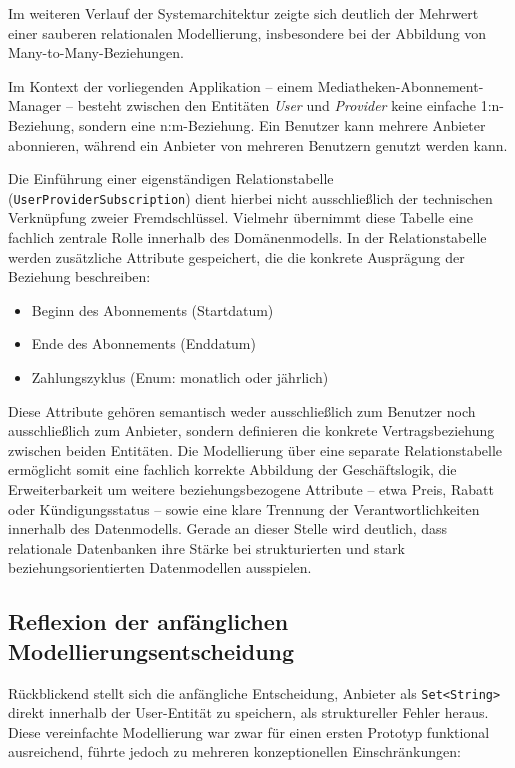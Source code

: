 Im weiteren Verlauf der Systemarchitektur zeigte sich deutlich der Mehrwert einer
sauberen relationalen Modellierung, insbesondere bei der Abbildung von
Many-to-Many-Beziehungen.

Im Kontext der vorliegenden Applikation -- einem Mediatheken-Abonnement-Manager --
besteht zwischen den Entitäten \textit{User} und \textit{Provider} keine einfache
1:n-Beziehung, sondern eine n:m-Beziehung. Ein Benutzer kann mehrere Anbieter
abonnieren, während ein Anbieter von mehreren Benutzern genutzt werden kann.

Die Einführung einer eigenständigen Relationstabelle (\texttt{UserProviderSubscription})
dient hierbei nicht ausschließlich der technischen Verknüpfung zweier Fremdschlüssel.
Vielmehr übernimmt diese Tabelle eine fachlich zentrale Rolle innerhalb des
Domänenmodells. In der Relationstabelle werden zusätzliche Attribute gespeichert,
die die konkrete Ausprägung der Beziehung beschreiben:

\begin{itemize}
    \item Beginn des Abonnements (Startdatum)
    \item Ende des Abonnements (Enddatum)
    \item Zahlungszyklus (Enum: monatlich oder jährlich)
\end{itemize}

Diese Attribute gehören semantisch weder ausschließlich zum Benutzer noch
ausschließlich zum Anbieter, sondern definieren die konkrete Vertragsbeziehung
zwischen beiden Entitäten. Die Modellierung über eine separate Relationstabelle
ermöglicht somit eine fachlich korrekte Abbildung der Geschäftslogik, die
Erweiterbarkeit um weitere beziehungsbezogene Attribute -- etwa Preis, Rabatt
oder Kündigungsstatus -- sowie eine klare Trennung der Verantwortlichkeiten
innerhalb des Datenmodells. Gerade an dieser Stelle wird deutlich, dass
relationale Datenbanken ihre Stärke bei strukturierten und stark
beziehungsorientierten Datenmodellen ausspielen.


\subsection{Reflexion der anfänglichen Modellierungsentscheidung}

Rückblickend stellt sich die anfängliche Entscheidung, Anbieter als
\texttt{Set<String>} direkt innerhalb der User-Entität zu speichern, als
struktureller Fehler heraus. Diese vereinfachte Modellierung war zwar für einen
ersten Prototyp funktional ausreichend, führte jedoch zu mehreren konzeptionellen
Einschränkungen:

